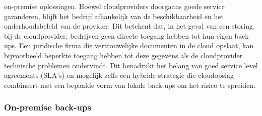 on-premise oplossingen. Hoewel cloudproviders doorgaans goede service garanderen, blijft het bedrijf afhankelijk van de beschikbaarheid en het onderhoudsbeleid van de provider. Dit betekent dat, in het geval van een storing bij de cloudprovider, bedrijven geen directe toegang hebben tot hun eigen back-ups. Een juridische firma die vertrouwelijke documenten in de cloud opslaat, kan bijvoorbeeld beperkte toegang hebben tot deze gegevens als de cloudprovider technische problemen ondervindt. Dit benadrukt het belang van goed service level agreements (SLA's) en mogelijk zelfs een hybride strategie die cloudopslag combineert met een bepaalde vorm van lokale back-ups om het risico te spreiden.


\subsubsection{On-premise back-ups}
